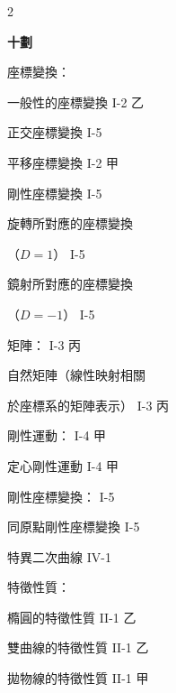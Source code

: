 \begin{multicols}{2}
\vspace{0.8em}
\begin{center}
\textbf{\large 十\quad 劃}
\end{center}

\noindent 座標變換：\par
\noindent\hspace*{1.5em} 一般性的座標變換 \hfill I-2 乙\par
\noindent\hspace*{1.5em} 正交座標變換 \hfill I-5\par
\noindent\hspace*{1.5em} 平移座標變換 \hfill I-2 甲\par
\noindent\hspace*{1.5em} 剛性座標變換 \hfill I-5\par
\noindent\hspace*{1.5em} 旋轉所對應的座標變換\par
\noindent\hspace*{3.0em} （$D=1$） \hfill I-5\par
\noindent\hspace*{1.5em} 鏡射所對應的座標變換\par
\noindent\hspace*{3.0em} （$D=-1$） \hfill I-5\par
\noindent 矩陣： \hfill I-3 丙\par
\noindent\hspace*{1.5em} 自然矩陣（線性映射相關\par
\noindent\hspace*{1.5em} 於座標系的矩陣表示） \hfill I-3 丙\par
\noindent 剛性運動： \hfill I-4 甲\par
\noindent\hspace*{1.5em} 定心剛性運動 \hfill I-4 甲\par
\noindent 剛性座標變換： \hfill I-5\par
\noindent\hspace*{1.5em} 同原點剛性座標變換 \hfill I-5\par
\noindent 特異二次曲線 \hfill IV-1\par
\noindent 特徵性質：\par
\noindent\hspace*{1.5em} 橢圓的特徵性質 \hfill II-1 乙\par
\noindent\hspace*{1.5em} 雙曲線的特徵性質 \hfill II-1 乙\par
\noindent\hspace*{1.5em} 拋物線的特徵性質 \hfill II-1 甲\par

\end{multicols}
